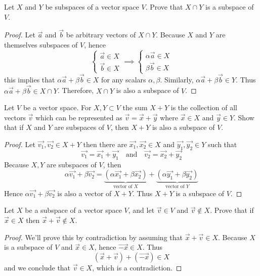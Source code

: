 \begin{exercise}
  Let $X$ and $Y$ be subspaces of a vector space $V$. Prove that
  $X\cap Y$ is a subspace of $V$.
\end{exercise}
\begin{proof}
  Let $\vec{a}$ and $\vec{b}$ be arbitrary vectors of $X\cap Y$.
  Because $X$ and $Y$ are themselves  subspaces of $V$, hence 
  \[
    \begin{cases}
      \vec{a}\in X\\
      \vec{b}\in X
    \end{cases}\implies
    \begin{cases}
      \alpha\vec{a}\in X\\
      \beta\vec{b}\in X
    \end{cases}
  \]
  this implies that $\alpha\vec{a}+\beta\vec{b}\in X$ for
  any scalars $\alpha,\beta$. Similarly, $\alpha\vec{a}+\beta\vec{b}\in Y$.
  Thus $\alpha\vec{a}+\beta\vec{b}\in X\cap Y$. Therefore, 
  $X\cap Y$ is also a subspace of $V$.
\end{proof}
\begin{exercise}
  Let $V$ be a vector space. For $X,Y\subset V$ the sum $X+Y$
  is the collection of all vectors $\vec{v}$ which can be represented as 
  $\vec{v}=\vec{x}+\vec{y}$ where $\vec{x}\in X$ and $\vec{y}\in Y$.
  Show that if $X$ and $Y$ are subspaces of $V$, then $X+Y$ is also
  a subspace of $V$.
\end{exercise}
\begin{proof}
  Let $\vec{v_1},\vec{v_2}\in X+Y$ then there are $\vec{x_1},\vec{x_2}\in X$
  and $\vec{y_1},\vec{y_2}\in Y$ such that
  \[
    \vec{v_1}=\vec{x_1}+\vec{y_1}
    \quad\text{and}\quad
    \vec{v_2}=\vec{x_2}+\vec{y_2}
  \]
  Because $X,Y$ are subspaces of $V$, then
  \[
    \alpha\vec{v_1}+\beta\vec{v_2}
    =\underbrace{(\alpha\vec{x_1}+\beta\vec{x_2})}_{\text{vector of $X$}} + 
    \underbrace{(\alpha\vec{y_1}+\beta\vec{y_2})}_{\text{vector of $Y$}}
  \]
  Hence $\alpha\vec{v_1}+\beta\vec{v_2}$ is also a vector of $X+Y$.
  Thus $X+Y$ is a subspace of $V$.
\end{proof}
\begin{exercise}
  Let $X$ be a subspace of a vector space $V$, and let $\vec{v}\in V$
  and $\vec{v}\notin X$. Prove that if $\vec{x}\in X$ then
  $\vec{x}+\vec{v}\notin X$.
\end{exercise}
\begin{proof}
  We'll prove this by contradiction by assuming that 
  $\vec{x}+\vec{v}\in X$. Because $X$ is a subspace of $V$ and 
  $\vec{x}\in X$, hence $\vec{-x}\in X$. Thus
  \[
    (\vec{x}+\vec{v})+(\vec{-x})\in X
  \]
  and we conclude that $\vec{v}\in X$, which is a contradiction.
\end{proof}
